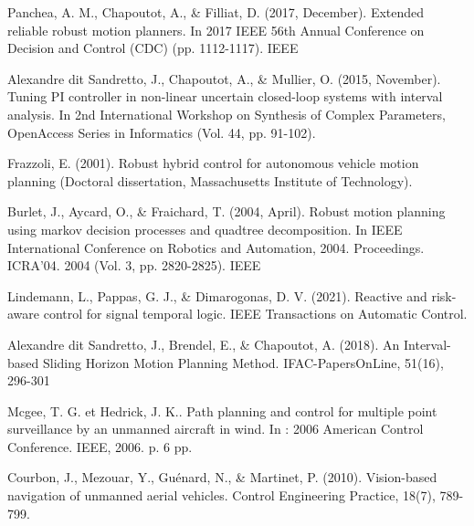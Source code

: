 \documentclass[letterpaper, 10 pt, conference]{ieeeconf}  %
\begin{document}
\begin{thebibliography}{99}
Panchea, A. M., Chapoutot, A., \& Filliat, D. (2017, December). Extended reliable robust motion planners. In 2017 IEEE 56th Annual Conference on Decision and Control (CDC) (pp. 1112-1117). IEEE

 Alexandre dit Sandretto, J., Chapoutot, A., \& Mullier, O. (2015, November). Tuning PI controller in non-linear uncertain closed-loop systems with interval analysis. In 2nd International Workshop on Synthesis of Complex Parameters, OpenAccess Series in Informatics (Vol. 44, pp. 91-102).

Frazzoli, E. (2001). Robust hybrid control for autonomous vehicle motion planning (Doctoral dissertation, Massachusetts Institute of Technology).

Burlet, J., Aycard, O., \& Fraichard, T. (2004, April). Robust motion planning using markov decision processes and quadtree decomposition. In IEEE International Conference on Robotics and Automation, 2004. Proceedings. ICRA'04. 2004 (Vol. 3, pp. 2820-2825). IEEE

Lindemann, L., Pappas, G. J., \& Dimarogonas, D. V. (2021). Reactive and risk-aware control for signal temporal logic. IEEE Transactions on Automatic Control.

Alexandre dit Sandretto, J., Brendel, E., \& Chapoutot, A. (2018). An Interval-based Sliding Horizon Motion Planning Method. IFAC-PapersOnLine, 51(16), 296-301

 Mcgee, T. G. et Hedrick, J. K.. Path planning and control for multiple point surveillance by an unmanned aircraft in wind. In : 2006 American Control Conference. IEEE, 2006. p. 6 pp.

 Courbon, J., Mezouar, Y., Guénard, N., \& Martinet, P. (2010). Vision-based navigation of unmanned aerial vehicles. Control Engineering Practice, 18(7), 789-799.

\end{thebibliography}
\end{document}
